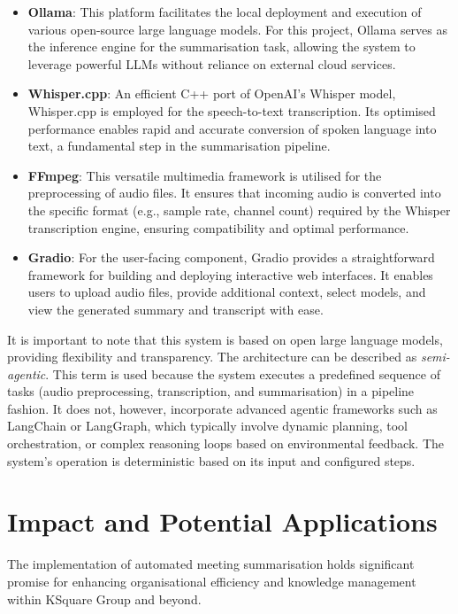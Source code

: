 \documentclass{article}
\begin{document}
\begin{itemize}
    \item \textbf{Ollama}: This platform facilitates the local deployment and execution of various open-source large language models. For this project, Ollama serves as the inference engine for the summarisation task, allowing the system to leverage powerful LLMs without reliance on external cloud services.
    \item \textbf{Whisper.cpp}: An efficient C++ port of OpenAI's Whisper model, Whisper.cpp is employed for the speech-to-text transcription. Its optimised performance enables rapid and accurate conversion of spoken language into text, a fundamental step in the summarisation pipeline.
    \item \textbf{FFmpeg}: This versatile multimedia framework is utilised for the preprocessing of audio files. It ensures that incoming audio is converted into the specific format (e.g., sample rate, channel count) required by the Whisper transcription engine, ensuring compatibility and optimal performance.
    \item \textbf{Gradio}: For the user-facing component, Gradio provides a straightforward framework for building and deploying interactive web interfaces. It enables users to upload audio files, provide additional context, select models, and view the generated summary and transcript with ease.
\end{itemize}

It is important to note that this system is based on open large language models, providing flexibility and transparency. The architecture can be described as \textit{semi-agentic}. This term is used because the system executes a predefined sequence of tasks (audio preprocessing, transcription, and summarisation) in a pipeline fashion. It does not, however, incorporate advanced agentic frameworks such as LangChain or LangGraph, which typically involve dynamic planning, tool orchestration, or complex reasoning loops based on environmental feedback. The system's operation is deterministic based on its input and configured steps.

\section{Impact and Potential Applications}
The implementation of automated meeting summarisation holds significant promise for enhancing organisational efficiency and knowledge management within KSquare Group and beyond.
\end{document}
